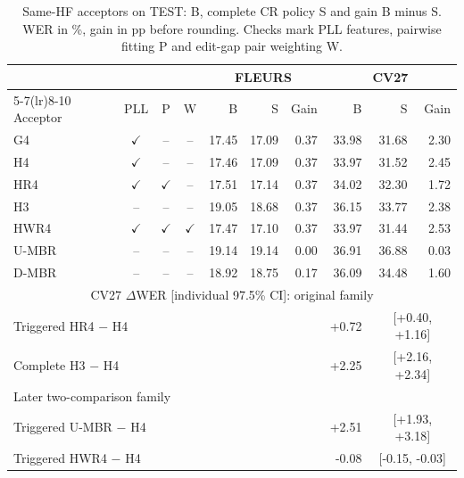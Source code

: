 \begin{table}[t]\centering\footnotesize
\caption{Same-HF acceptors on TEST: B, complete CR policy S and gain B minus S. WER in \%, gain in pp before rounding. Checks mark PLL features, pairwise fitting P and edit-gap pair weighting W.}\label{tab:hfacceptors}
\setlength{\tabcolsep}{2pt}\renewcommand{\arraystretch}{1.03}
\begin{tabular}{@{}lcccrrrrrr@{}}\toprule
 & & & & \multicolumn{3}{c}{FLEURS} & \multicolumn{3}{c}{CV27}\\
\cmidrule(lr){5-7}\cmidrule(lr){8-10}
Acceptor & PLL & P & W & B & S & Gain & B & S & Gain\\\midrule
G4 & $\checkmark$ & -- & -- & 17.45 & 17.09 & 0.37 & 33.98 & 31.68 & 2.30\\
H4 & $\checkmark$ & -- & -- & 17.46 & 17.09 & 0.37 & 33.97 & 31.52 & 2.45\\
HR4 & $\checkmark$ & $\checkmark$ & -- & 17.51 & 17.14 & 0.37 & 34.02 & 32.30 & 1.72\\
H3 & -- & -- & -- & 19.05 & 18.68 & 0.37 & 36.15 & 33.77 & 2.38\\
HWR4 & $\checkmark$ & $\checkmark$ & $\checkmark$ & 17.47 & 17.10 & 0.37 & 33.97 & 31.44 & 2.53\\
U-MBR & -- & -- & -- & 19.14 & 19.14 & 0.00 & 36.91 & 36.88 & 0.03\\
D-MBR & -- & -- & -- & 18.92 & 18.75 & 0.17 & 36.09 & 34.48 & 1.60\\
\midrule\multicolumn{10}{c}{CV27 $\Delta$WER [individual 97.5\% CI]: original family}\\
\multicolumn{7}{l}{Triggered HR4 $-$ H4} & +0.72 & \multicolumn{2}{c}{[+0.40, +1.16]}\\
\multicolumn{7}{l}{Complete H3 $-$ H4} & +2.25 & \multicolumn{2}{c}{[+2.16, +2.34]}\\
\multicolumn{10}{l}{Later two-comparison family}\\
\multicolumn{7}{l}{Triggered U-MBR $-$ H4} & +2.51 & \multicolumn{2}{c}{[+1.93, +3.18]}\\
\multicolumn{7}{l}{Triggered HWR4 $-$ H4} & -0.08 & \multicolumn{2}{c}{[-0.15, -0.03]}\\
\bottomrule\end{tabular}\end{table}
